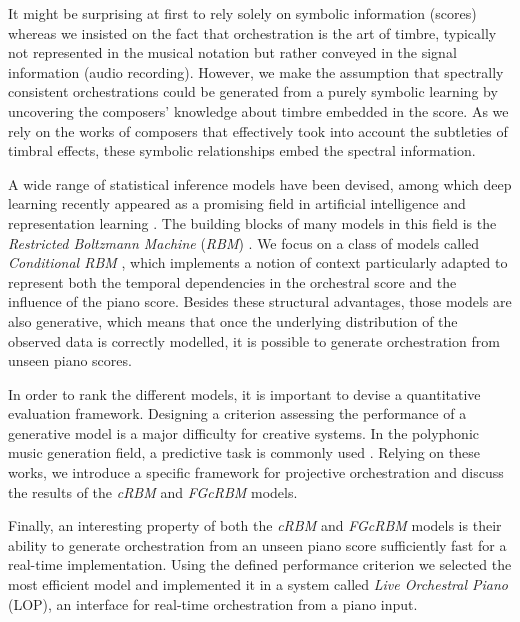 \documentclass{amsart}
\begin{document}
	It might be surprising at first to rely solely on symbolic information (scores) whereas we insisted on the fact that orchestration is the art of timbre, typically not represented in the musical notation but rather conveyed in the signal information (audio recording).
	However, we make the assumption that spectrally consistent orchestrations could be generated from a purely symbolic learning by uncovering the composers' knowledge about timbre embedded in the score. As we rely on the works of composers that effectively took into account the subtleties of timbral effects, these symbolic relationships embed the spectral information.
	
	A wide range of statistical inference models have been devised, among which deep learning recently appeared as a  promising field in artificial intelligence and representation learning \cite{bengio2013representation,LeCun:2015aa}. The building blocks of many models in this field is the \textit{Restricted Boltzmann Machine} (\textit{RBM}) \cite{hinton2006fast}.
	We focus on a class of models called \textit{Conditional RBM} \cite{taylor2006modeling}, which implements a notion of context particularly adapted to represent both the temporal dependencies in the orchestral score and the influence of the piano score.
	Besides these structural advantages, those models are also generative, which means that once the underlying distribution of the observed data is correctly modelled, it is possible to generate orchestration from unseen piano scores.
	
	In order to rank the different models, it is important to devise a quantitative evaluation framework. Designing a criterion assessing the performance of a generative model is a major difficulty for creative systems. In the polyphonic music generation field, a predictive task is commonly used \cite{DBLP:journals/corr/YaoCVDD15,boulanger2012modeling,lavrenko2003polyphonic}. Relying on these works, we introduce a specific framework for projective orchestration and discuss the results of the \textit{cRBM} and \textit{FGcRBM} models.
	
	Finally, an interesting property of both the \textit{cRBM} and \textit{FGcRBM} models is their ability to generate orchestration from an unseen piano score sufficiently fast for a real-time implementation.
	Using the defined performance criterion we selected the most efficient model and implemented it in a system called \textit{Live Orchestral Piano} (LOP), an interface for real-time orchestration from a piano input.
	
\end{document}
